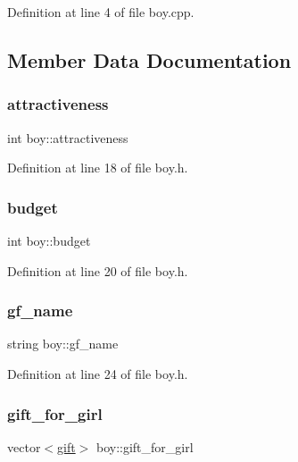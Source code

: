 Definition at line 4 of file boy.\+cpp.



\subsection{Member Data Documentation}
\mbox{\label{classboy_a8fff0880998598f79dc602a4345f0c67}} 
\subsubsection{\texorpdfstring{attractiveness}{attractiveness}}
{\footnotesize\ttfamily int boy\+::attractiveness}



Definition at line 18 of file boy.\+h.

\mbox{\label{classboy_a80d6bd6642a612cf0428ab56a2098316}} 
\subsubsection{\texorpdfstring{budget}{budget}}
{\footnotesize\ttfamily int boy\+::budget}



Definition at line 20 of file boy.\+h.

\mbox{\label{classboy_ad15ed51808a67b109dd390a32d0ba87e}} 
\subsubsection{\texorpdfstring{gf\+\_\+name}{gf\_name}}
{\footnotesize\ttfamily string boy\+::gf\+\_\+name}



Definition at line 24 of file boy.\+h.

\mbox{\label{classboy_abfc2b050b37f049e54ed586c824b15e6}} 
\subsubsection{\texorpdfstring{gift\+\_\+for\+\_\+girl}{gift\_for\_girl}}
{\footnotesize\ttfamily vector$<$\hyperlink{classgift}{gift}$>$ boy\+::gift\+\_\+for\+\_\+girl}



